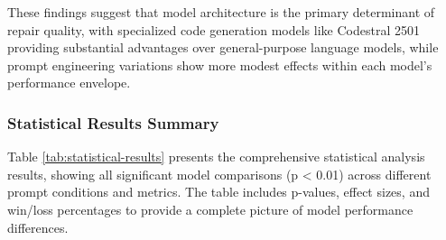 These findings suggest that model architecture is the primary determinant of repair quality, with specialized code generation models like Codestral 2501 providing substantial advantages over general-purpose language models, while prompt engineering variations show more modest effects within each model's performance envelope.

\subsubsection{Statistical Results Summary}
Table \ref{tab:statistical-results} presents the comprehensive statistical analysis results, showing all significant model comparisons (p < 0.01) across different prompt conditions and metrics. The table includes p-values, effect sizes, and win/loss percentages to provide a complete picture of model performance differences.

